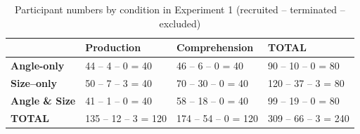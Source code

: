 \documentclass[a4paper, 11pt]{article}
\begin{document}
	\begin{table}
	\begin{center}
	\caption{Participant numbers by condition in Experiment 1 (recruited – terminated – excluded)}
	\sffamily
	\small
	\begin{tabular}{llll}
	\hline
	& \bfseries Production & \bfseries Comprehension & \bfseries TOTAL \\ \hline
	\bfseries Angle-only    & 44 – 4 – 0 = 40    & 46 – 6 – 0 = 40    & 90 – 10 – 0 = 80 \\
	\bfseries Size–only     & 50 – 7 – 3 = 40    & 70 – 30 – 0 = 40   & 120 – 37 – 3 = 80 \\
	\bfseries Angle \& Size & 41 – 1 – 0 = 40    & 58 – 18 – 0 = 40   & 99 – 19 – 0 = 80 \\
	\bfseries TOTAL         & 135 – 12 – 3 = 120 & 174 – 54 – 0 = 120 & 309 – 66 – 3 = 240 \\ \hline
	\end{tabular}
	\label{tb_exp1_participant_numbers}
	\end{center}
	\end{table}



\end{document}
